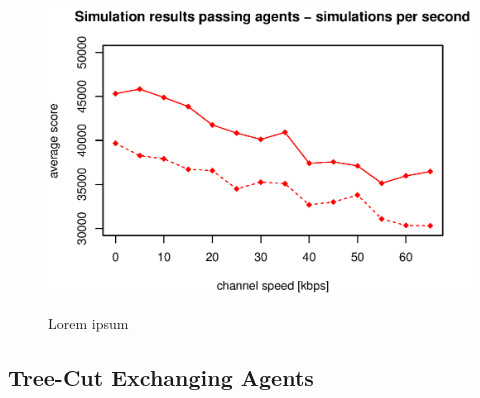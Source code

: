 \begin{figure}
\begin{center}
\includegraphics{img/simulation-passing-sims-per-sec.eps}
\end{center}
\caption{\footnotesize Lorem ipsum}{\footnotesize }
\label{fig_simulation_passing_sims_per_sec}
\end{figure}

\subsection{Tree-Cut Exchanging Agents}


